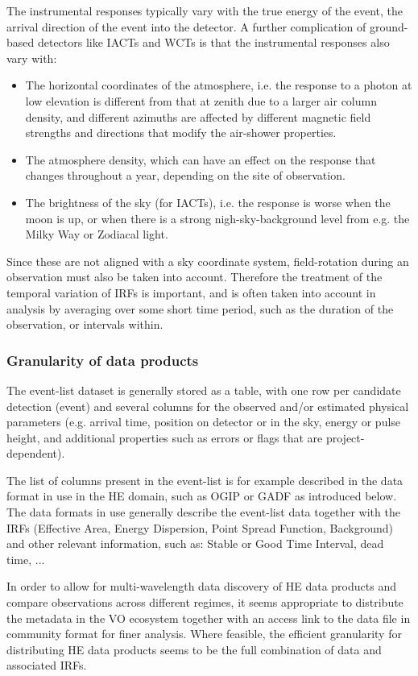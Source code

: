 \documentclass[11pt,a4paper]{ivoa}
\begin{document}
The instrumental responses typically vary with the true energy of the event, the arrival direction of the event into the
detector. A further complication of ground-based detectors like IACTs and WCTs is that the instrumental responses also vary with:
\begin{itemize}
  \item The horizontal coordinates of the atmosphere, i.e. the response to a photon at low elevation is different from that at zenith due to a larger air column density, and different azimuths are affected by different magnetic field strengths and directions that modify the air-shower properties.
  \item The atmosphere density, which can have an effect on the response that changes throughout a year, depending on the site of observation.
  \item The brightness of the sky (for IACTs), i.e. the response is worse when the moon is up, or when there is a strong nigh-sky-background level from e.g. the Milky Way or Zodiacal light.
\end{itemize}
Since these are not aligned with a sky coordinate system, field-rotation during an observation must also be taken into account.
Therefore the treatment of the temporal variation of IRFs is important, and is often taken into account in analysis by averaging over some short time period, such as the duration of the observation, or intervals within.

\subsubsection{Granularity of data products}

The event-list dataset is generally stored as a table, with one row per candidate detection (event) and several columns
for the observed and/or estimated physical parameters (e.g. arrival time, position on detector or in the sky, energy or
pulse height, and additional properties such as errors or flags that are project-dependent).

The list of columns present in the event-list is for example described in the data format in use in the HE domain,
such as OGIP or GADF as introduced below. The data formats in use generally describe the event-list data together
with the IRFs (Effective Area, Energy Dispersion, Point Spread Function, Background) and other relevant information, such
as: Stable or Good Time Interval, dead time, ...

In order to allow for multi-wavelength data discovery of HE data products and compare observations across different regimes,
it seems appropriate to distribute the metadata in the VO ecosystem together with an access link to the data file in
community format for finer analysis. Where feasible, the efficient granularity for distributing HE data products seems
to be the full combination of data and associated IRFs.
\end{document}
